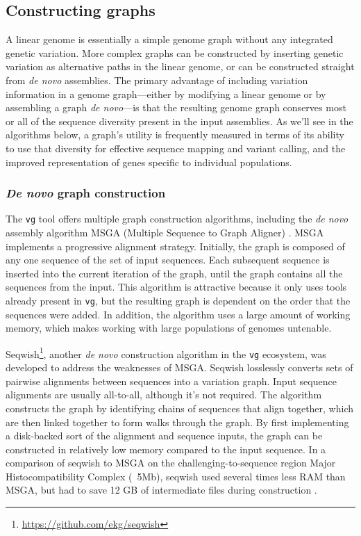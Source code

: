 \subsection{Constructing graphs}

A linear genome is essentially a simple genome graph without any integrated genetic variation. 
More complex graphs can be constructed by inserting genetic variation as alternative paths in the linear genome, or can be constructed straight from \textit{de novo} assemblies. 
The primary advantage of including variation information in a genome graph---either by modifying a linear genome or by assembling a graph \textit{de novo}---is that the resulting genome graph conserves most or all of the sequence diversity present in the input assemblies. 
As we'll see in the algorithms below, a graph's utility is frequently measured in terms of its ability to use that diversity for effective sequence mapping and variant calling, and the improved representation of genes specific to individual populations.

\subsubsection{\textit{De novo} graph construction}

The \texttt{vg} tool offers multiple graph construction algorithms, including the \textit{de novo} assembly algorithm MSGA (Multiple Sequence to Graph Aligner) \cite{Garrison_2018,Novak_2017a}. 
MSGA implements a progressive alignment strategy.
Initially, the graph is composed of any one sequence of the set of input sequences.
Each subsequent sequence is inserted into the current iteration of the graph, until the graph contains all the sequences from the input.
This algorithm is attractive because it only uses tools already present in \texttt{vg}, but the resulting graph is dependent on the order that the sequences were added.
In addition, the algorithm uses a large amount of working memory, which makes working with large populations of genomes untenable.

Seqwish\footnote{\url{https://github.com/ekg/seqwish}}, another \textit{de novo} construction algorithm in the \texttt{vg} ecosystem, was developed to address the weaknesses of MSGA.
Seqwish losslessly converts sets of pairwise alignments between sequences into a variation graph.
Input sequence alignments are usually all-to-all, although it's not required.
The algorithm constructs the graph by identifying chains of sequences that align together, which are then linked together to form walks through the graph.
By first implementing a disk-backed sort of the alignment and sequence inputs, the graph can be constructed in relatively low memory compared to the input sequence.
In a comparison of seqwish to MSGA on the challenging-to-sequence region Major Histocompatibility Complex (~5Mb), seqwish used several times less RAM than MSGA, but had to save 12 GB of intermediate files during construction .



